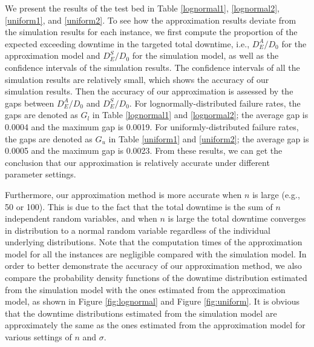 \documentclass[preprint,12pt]{elsarticle}
\begin{document}
We present the results of the test bed in Table \ref{lognormal1}, \ref{lognormal2}, \ref{uniform1}, and \ref{uniform2}. To see how the approximation results deviate from the simulation results for each instance, we first compute the proportion of the expected exceeding downtime in the targeted total downtime, i.e., $D_{E}^{A}/D_0$ for the approximation model and $D_{E}^{S}/D_0$ for the simulation model, as well as the confidence intervals of the simulation results. The confidence intervals of all the simulation results are relatively small, which shows the accuracy of our simulation results. Then the accuracy of our approximation is assessed by the gaps between $D_{E}^{A}/D_0$ and $D_{E}^{S}/D_0$. For lognormally-distributed failure rates, the gaps are denoted as $G_l$ in Table \ref{lognormal1} and \ref{lognormal2}; the average gap is 0.0004 and the maximum gap is 0.0019. For uniformly-distributed failure rates, the gaps are denoted as $G_u$ in Table \ref{uniform1} and \ref{uniform2}; the average gap is  0.0005 and the maximum gap is 0.0023. From these results, we can get the conclusion that our approximation is relatively accurate under different parameter settings.


Furthermore, our approximation method is more accurate when $n$ is large (e.g., 50 or 100). This is due to the fact that the total downtime is the sum of $n$ independent random variables, and when $n$ is large the total downtime converges in distribution to a normal random variable regardless of the individual underlying distributions. Note that the computation times of the approximation model for all the instances are negligible compared with the simulation model. In order to better demonstrate the accuracy of our approximation method, we also compare the probability density functions of the downtime distribution estimated from the simulation model with the ones estimated from the approximation model, as shown in Figure \ref{fig:lognormal} and Figure \ref{fig:uniform}. It is obvious that the downtime distributions estimated from the simulation model are approximately the same as the ones estimated from the approximation model for various settings of $n$ and $\sigma$.
\end{document}
